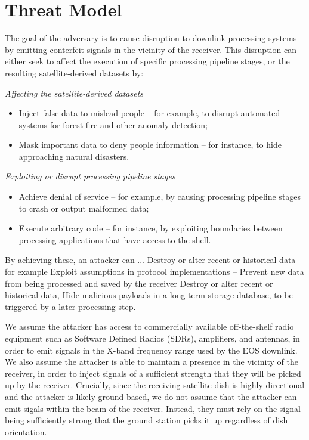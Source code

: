 \section{Threat Model}\label{sec:threat-model}

The goal of the adversary is to cause disruption to downlink processing systems by emitting conterfeit signals in the vicinity of the receiver.
This disruption can either seek to affect the execution of specific processing pipeline stages, or the resulting satellite-derived datasets by:


\noindent\textit{Affecting the satellite-derived datasets}
\begin{itemize}
    \item Inject false data to mislead people -- for example, to disrupt automated systems for forest fire and other anomaly detection;
    \item Mask important data to deny people information -- for instance, to hide approaching natural disasters.
\end{itemize}

\noindent\textit{Exploiting or disrupt processing pipeline stages}
\begin{itemize}
    \item Achieve denial of service -- for example, by causing processing pipeline stages to crash or output malformed data;
    \item Execute arbitrary code -- for instance, by exploiting boundaries between processing applications that have access to the shell.
\end{itemize}

By achieving these, an attacker can ...
Destroy or alter recent or historical data -- for example
Exploit assumptions in protocol implementations -- 
Prevent new data from being processed and saved by the receiver
Destroy or alter recent or historical data,
Hide malicious payloads in a long-term storage database, to be triggered by a later processing step.



We assume the attacker has access to commercially available off-the-shelf radio equipment such as Software Defined Radios (SDRs), amplifiers, and antennas, in order to emit signals in the X-band frequency range used by the EOS downlink.
We also assume the attacker is able to maintain a presence in the vicinity of the receiver, in order to inject signals of a sufficient strength that they will be picked up by the receiver.
Crucially, since the receiving satellite dish is highly directional and the attacker is likely ground-based, we do not assume that the attacker can emit sigals within the beam of the receiver.
Instead, they must rely on the signal being sufficiently strong that the ground station picks it up regardless of dish orientation.

